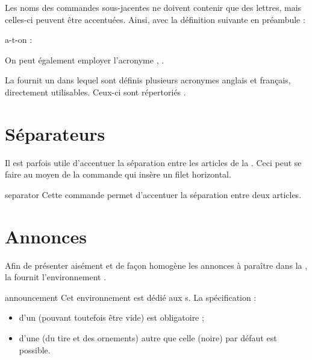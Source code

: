 \documentclass{letgut}
\begin{document}
Les noms des commandes sous-jacentes ne doivent contenir que des lettres, mais
celles-ci peuvent être accentuées. Ainsi, avec la définition suivante en
préambule :

\begin{ltx-code}[title addon=définition d'acronyme avec lettres
  accentuées,drop lifted shadow]
\end{ltx-code}

a-t-on :

\begin{ltx-code-result}[title addon=utilisation d'acronyme avec lettres accentuées,listing options app={deletekeywords={[3]{l}}}]
On peut également employer l'acronyme , .
\end{ltx-code-result}

La  fournit un  dans lequel sont définis
plusieurs acronymes anglais et français, directement utilisables. Ceux-ci sont
répertoriés .

\section{Séparateurs}
\label{sec:filets}

Il est parfois utile d'accentuer la séparation entre les articles de la
. Ceci peut se faire au moyen de la commande  qui
insère un filet horizontal.

\begin{docCommand}{separator}{}
  Cette commande permet d'accentuer la séparation entre deux articles.
\end{docCommand}

\section{Annonces}
\label{sec:annonces}

Afin de présenter aisément et de façon homogène les annonces à paraître dans la
, la  fournit l'environnement .

\begin{docEnvironment}[doclang/environment content=annonce]{announcement}{}
  Cet environnement est dédié aux s. La spécification :
  \begin{itemize}
  \item d'un  (pouvant toutefois être vide) est obligatoire ;
  \item d'une  (du tire et des ornements) autre que celle (noire)
    par défaut est possible.
  \end{itemize}
\end{docEnvironment}
\end{document}
